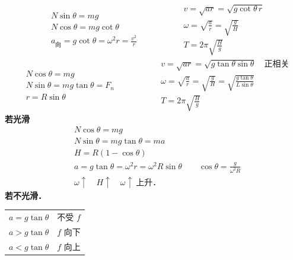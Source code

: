 \[
\begin{aligned}
&N\sin\theta = mg\\
&N\cos\theta = mg\cot\theta\\
&a_{\text{向}} = g\cot\theta = \omega^2 r = \frac{v^2}{r}
\end{aligned}
\qquad\qquad
\begin{aligned}
&v=\sqrt{ar}=\sqrt{g\cot\theta\,r}\\
&\omega=\sqrt{\frac{a}{r}}=\sqrt{\frac{g}{H}}\\
&T=2\pi\sqrt{\frac{H}{g}}
\end{aligned}
\]
\[
\begin{aligned}
&N\cos\theta = mg\\
&N\sin\theta = mg\tan\theta = F_n\\
&r = R\sin\theta
\end{aligned}
\qquad\qquad
\begin{aligned}
&v=\sqrt{ar}=\sqrt{g\tan\theta\sin\theta}\quad\text{正相关}\\
&\omega=\sqrt{\frac{a}{r}}=\sqrt{\frac{g}{H}}=\sqrt{\frac{g\tan\theta}{L\sin\theta}}\\
&T=2\pi\sqrt{\frac{H}{g}}
\end{aligned}
\]
\textbf{若光滑}
\begin{align*}
&N\cos\theta = mg\\
&N\sin\theta = mg\tan\theta = ma\\
&H = R(1-\cos\theta)\\
&a = g\tan\theta = \omega^2 r = \omega^2 R\sin\theta \qquad \cos\theta = \frac{g}{\omega^2 R}\\
&\omega\uparrow\quad H\uparrow\quad \omega\uparrow\ \text{上升．}
\end{align*}
\textbf{若不光滑．}
\begin{center}
\begin{tabular}{@{}ll@{}}
$a=g\tan\theta$ & 不受 $f$\\
$a>g\tan\theta$ & $f$ 向下\\
$a<g\tan\theta$ & $f$ 向上\\
\end{tabular}
\end{center}

